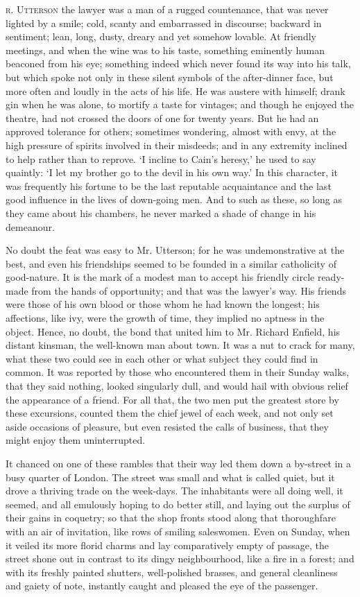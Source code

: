 \documentclass[]{novel}
\begin{document}
\textsc{r. Utterson} the lawyer was a man of a rugged countenance, that was never lighted by a smile; cold, scanty and embarrassed in discourse; backward in sentiment; lean, long, dusty, dreary and yet somehow lovable. At friendly meetings, and when the wine was to his taste, something eminently human beaconed from his eye; something indeed which never found its way into his talk, but which spoke not only in these silent symbols of the after-dinner face, but more often and loudly in the acts of his life. He was austere with himself; drank gin when he was alone, to mortify a taste for vintages; and though he enjoyed the theatre, had not crossed the doors of one for twenty years. But he had an approved tolerance for others; sometimes wondering, almost with envy, at the high pressure of spirits involved in their misdeeds; and in any extremity inclined to help rather than to reprove. ‘I incline to Cain’s heresy,’ he used to say quaintly: ‘I let my brother go to the devil in his own way.’ In this character, it was frequently his fortune to be the last reputable acquaintance and the last good influence in the lives of down-going men. And to such as these, so long as they came about his chambers, he never marked a shade of change in his demeanour.

No doubt the feat was easy to Mr. Utterson; for he was undemonstrative at the best, and even his friendships seemed to be founded in a similar catholicity of good-nature. It is the mark of a modest man to accept his friendly circle ready-made from the hands of opportunity; and that was the lawyer’s way. His friends were those of his own blood or those whom he had known the longest; his affections, like ivy, were the growth of time, they implied no aptness in the object. Hence, no doubt, the bond that united him to Mr. Richard Enfield, his distant kinsman, the well-known man about town. It was a nut to crack for many, what these two could see in each other or what subject they could find in common. It was reported by those who encountered them in their Sunday walks, that they said nothing, looked singularly dull, and would hail with obvious relief the appearance of a friend. For all that, the two men put the greatest store by these excursions, counted them the chief jewel of each week, and not only set aside occasions of pleasure, but even resisted the calls of business, that they might enjoy them uninterrupted.

It chanced on one of these rambles that their way led them down a by-street in a busy quarter of London. The street was small and what is called quiet, but it drove a thriving trade on the week-days. The inhabitants were all doing well, it seemed, and all emulously hoping to do better still, and laying out the surplus of their gains in coquetry; so that the shop fronts stood along that thoroughfare with an air of invitation, like rows of smiling saleswomen. Even on Sunday, when it veiled its more florid charms and lay comparatively empty of passage, the street shone out in contrast to its dingy neighbourhood, like a fire in a forest; and with its freshly painted shutters, well-polished brasses, and general cleanliness and gaiety of note, instantly caught and pleased the eye of the passenger.
\end{document}

